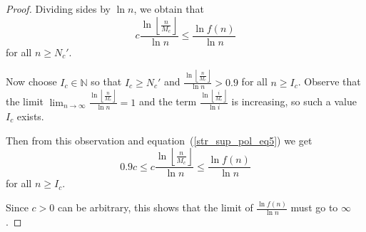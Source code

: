 \documentclass[11pt]{amsart}
\theoremstyle{definition}
\newcommand\N{\mathbb N}
\renewcommand{\geq}{\geqslant} \renewcommand{\leq}{\leqslant} \renewcommand{\ge}{\geqslant} \renewcommand{\le}{\leqslant}
\begin{document}
\begin{appendix}
\begin{proof}
    Dividing sides
    by $\ln n$, we obtain that
         \begin{equation}
    \label{str_sup_pol_eq5}
       c \frac{\ln \left\lfloor \frac{n}{M_c}
       \right\rfloor}{\ln n}
       \leq
         \frac{\ln f (n)}{\ln n}
    \end{equation} for all $n\geq N_c'$.

    Now choose $I_c\in \N$ so that $I_c\geq N_c'$
    and $\frac{\ln \left\lfloor \frac{n}{M_c}
       \right\rfloor}{\ln n}>0.9$ for all $n\geq I_c$. Observe that the limit  $\lim_{n\to\infty}\frac{\ln \left\lfloor \frac{n}{M_c}
       \right\rfloor}{\ln n}=1$ and the term $\frac{\ln \left\lfloor \frac{i}{M_c}
       \right\rfloor}{\ln i}$ is increasing, so such a value $I_c$ exists.

    Then from this observation and equation~(\ref{str_sup_pol_eq5})  we get
      \begin{equation*}
    \label{str_sup_pol_eq6}
     0.9c\leq   c  \frac{\ln \left\lfloor \frac{n}{M_c}
       \right\rfloor}{\ln n}
       \leq
         \frac{\ln f (n)}{\ln n}
    \end{equation*} for all $n\geq I_c$.


    Since $c>0$ can be arbitrary, this shows that the limit of $  \frac{\ln f (n)}{\ln n}$ must go to $\infty$.
    \end{proof}

\end{appendix}


\end{document}

